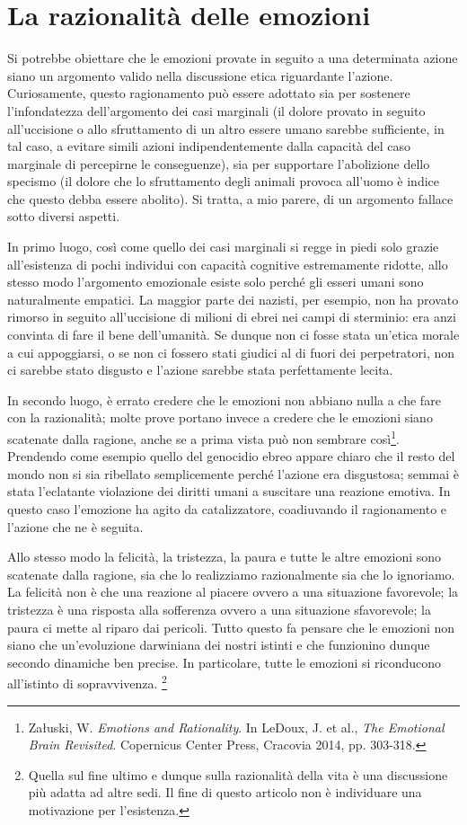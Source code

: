 \documentclass[a4paper,11pt,oneside,article]{memoir}
\begin{document}
\section{La razionalità delle emozioni}

Si potrebbe obiettare che le emozioni provate in seguito a una determinata
azione siano un argomento valido nella discussione etica riguardante l'azione.
Curiosamente, questo ragionamento può essere adottato sia per sostenere
l'infondatezza dell'argomento dei casi marginali (il dolore provato in seguito
all'uccisione o allo sfruttamento di un altro essere umano sarebbe sufficiente,
in tal caso, a evitare simili azioni indipendentemente dalla capacità del caso
marginale di percepirne le conseguenze), sia per supportare l'abolizione dello
specismo (il dolore che lo sfruttamento degli animali provoca all'uomo è indice
che questo debba essere abolito). Si tratta, a mio parere, di un argomento
fallace sotto diversi aspetti.

In primo luogo, così come quello dei casi marginali si regge in piedi solo
grazie all'esistenza di pochi individui con capacità cognitive estremamente
ridotte, allo stesso modo l'argomento emozionale esiste solo perché gli esseri
umani sono naturalmente empatici. La maggior parte dei nazisti, per esempio, non
ha provato rimorso in seguito all'uccisione di milioni di ebrei nei campi di
sterminio: era anzi convinta di fare il bene dell'umanità. Se dunque non ci
fosse stata un'etica morale a cui appoggiarsi, o se non ci fossero stati giudici
al di fuori dei perpetratori, non ci sarebbe stato disgusto e l'azione sarebbe
stata perfettamente lecita.

In secondo luogo, è errato credere che le emozioni non abbiano nulla a che fare
con la razionalità; molte prove portano invece a credere che le emozioni siano
scatenate dalla ragione, anche se a prima vista può non sembrare
così\footnote{Załuski, W. \emph{Emotions and Rationality}. In LeDoux, J. et al.,
\emph{The Emotional Brain Revisited}. Copernicus Center Press, Cracovia 2014,
pp. 303-318.}. Prendendo come esempio quello del genocidio ebreo appare chiaro
che il resto del mondo non si sia ribellato semplicemente perché l'azione era
disgustosa; semmai è stata l'eclatante violazione dei diritti umani a suscitare
una reazione emotiva. In questo caso l'emozione ha agito da catalizzatore,
coadiuvando il ragionamento e l'azione che ne è seguita.

Allo stesso modo la felicità, la tristezza, la paura e tutte le altre emozioni
sono scatenate dalla ragione, sia che lo realizziamo razionalmente sia che lo
ignoriamo. La felicità non è che una reazione al piacere ovvero a una situazione
favorevole; la tristezza è una risposta alla sofferenza ovvero a una situazione
sfavorevole; la paura ci mette al riparo dai pericoli. Tutto questo fa pensare
che le emozioni non siano che un'evoluzione darwiniana dei nostri istinti e che
funzionino dunque secondo dinamiche ben precise. In particolare, tutte le
emozioni si riconducono all'istinto di sopravvivenza. \footnote{Quella sul fine
ultimo e dunque sulla razionalità della vita è una discussione più adatta ad
altre sedi. Il fine di questo articolo non è individuare una motivazione per
l'esistenza.}
\end{document}
